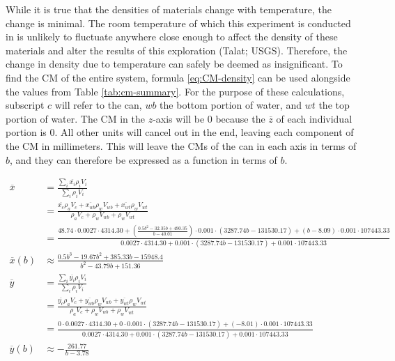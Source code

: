 \documentclass[11pt]{article}
\begin{document}
    While it is true that the densities of materials change with temperature, the change is minimal. The room temperature of which this experiment is conducted in is unlikely to fluctuate anywhere close enough to affect the density of these materials and alter the results of this exploration (Talat; USGS). Therefore, the change in density due to temperature can safely be deemed as insignificant. To find the CM of the entire system, formula \eqref{eq:CM-density} can be used alongside the values from Table \ref{tab:cm-summary}. For the purpose of these calculations, subscript $c$ will refer to the can, $wb$ the bottom portion of water, and $wt$ the top portion of water. The CM in the $z$-axis will be $0$ because the $\overline{z}$ of each individual portion is $0$. All other units will cancel out in the end, leaving each component of the CM in millimeters. This will leave the CMs of the can in each axis in terms of $b$, and they can therefore be expressed as a function in terms of $b$.

    {\footnotesize\begin{align*}
        \overline{x} &= \frac{\sum_i \overline{x_i} \rho_i V_i}{\sum_i \rho_i V_i} \\
        &= \frac{\overline{x_c} \rho_{a} V_c + \overline{x_{wb}} \rho_{w} V_{wb} + \overline{x_{wt}} \rho_{w} V_{wt}}{\rho_{a} V_c + \rho_{w} V_{wb} + \rho_{w} V_{wt}} \\
        &= \frac{48.74 \cdot 0.0027 \cdot 4314.30 + \left( \frac{0.5b^2 - 32.35b + 490.35}{b - 40.01} \right) \cdot 0.001 \cdot (3287.74b - 131530.17) + (b - 8.09) \cdot 0.001 \cdot 107443.33}{0.0027 \cdot 4314.30 + 0.001 \cdot (3287.74b - 131530.17) + 0.001 \cdot 107443.33} \\
        \overline{x}(b) &\approx \frac{0.5b^3 - 19.67b^2 + 385.33b - 15948.4}{b^2 - 43.79b + 151.36} \\[12pt]
        \overline{y} &= \frac{\sum_i \overline{y_i} \rho_i V_i}{\sum_i \rho_i V_i} \\
        &= \frac{\overline{y_c} \rho_{a} V_c + \overline{y_{wb}} \rho_{w} V_{wb} + \overline{y_{wt}} \rho_{w} V_{wt}}{\rho_{a} V_c + \rho_{w} V_{wb} + \rho_{w} V_{wt}} \\
        &= \frac{0 \cdot 0.0027 \cdot 4314.30 + 0 \cdot 0.001 \cdot (3287.74b - 131530.17) + (-8.01) \cdot 0.001 \cdot 107443.33}{0.0027 \cdot 4314.30 + 0.001 \cdot (3287.74b - 131530.17) + 0.001 \cdot 107443.33} \\
        \overline{y}(b) &\approx -\frac{261.77}{b - 3.78}
    \end{align*}}
\end{document}

